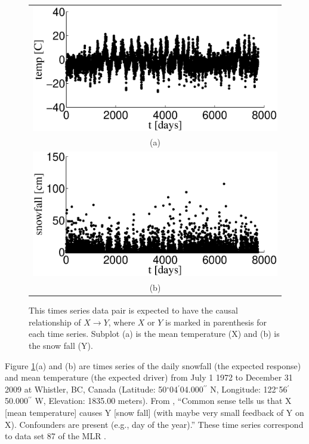 \documentclass[twocolumn,aps,pre,groupedaddress]{revtex4-1}
\begin{document}
\begin{figure}[ht]
\begin{tabular}{c}
\includegraphics[scale=0.46]{EmpiricalData_p87X.eps} \\
(a) \\ 
\includegraphics[scale=0.46]{EmpiricalData_p87Y.eps} \\
(b) \\
\end{tabular}
\caption{This times series data pair is expected to have the causal relationship of $X\rightarrow Y$, where $X$ or $Y$ is marked in parenthesis for each time series.  Subplot (a) is the mean temperature (X) and (b) is the snow fall (Y).}
\label{fig:empdata}
\end{figure}
Figure \ref{fig:empdata}(a) and (b)  are times series of the daily snowfall (the expected response) and mean temperature (the expected driver) from July 1 1972 to December 31 2009 at Whistler, BC, Canada (Latitude: 50$^\circ$04$^\prime$04.000$^{\prime\prime}$ N, Longitude: 122$^\circ$56$^\prime$50.000$^{\prime\prime}$ W, Elevation: 1835.00 meters).  From \cite{bache2013}, ``Common sense tells us that X [mean temperature] causes Y [snow fall] (with maybe very small feedback of Y on X). Confounders are present (e.g., day of the year).''  These time series correspond to data set 87 of the MLR \cite{bache2013}.
\end{document}

